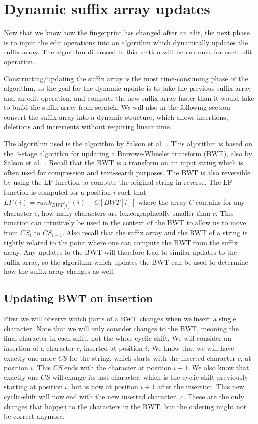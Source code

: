 \section{Dynamic suffix array updates}

Now that we know how the fingerprint has changed after an edit, the next phase is to input
the edit operations into an algorithm which dynamically updates the suffix array. The
algorithm discussed in this section will be run once for each edit operation.

Constructing/updating the suffix array is the most time-consuming phase of the algorithm,
so the goal for the dynamic update is to take the previous suffix array and an edit
operation, and compute the new suffix array faster than it would take to build the suffix
array from scratch. We will also in the following section convert the suffix array into a
dynamic structure, which allows insertions, deletions and increments without requiring
linear time.

The algorithm used is the algorithm by Salson et al.~\cite{DynamicExtendedSuffixArrays}.
This algorithm is based on the 4-stage algorithm for updating a Burrows-Wheeler transform
(BWT), also by Salson et al.~\cite{DynamicBWT}. Recall that the BWT is a transform on an
input string which is often used for compression and text-search purposes. The BWT is also
reversible by using the LF function to compute the original string in reverse. The
LF function is computed for a position $i$ such that $LF(i) = rank_{BWT[i]}(i) + C[BWT[i]]$
where the array $C$ contains for any character $c$, how many characters are
lexicographically smaller than $c$. This function can intuitively be used in the context
of the BWT to allow us to move from $CS_i$ to $CS_{i-1}$. Also recall that the suffix
array and the BWT of a string is tightly related to the point where one can compute the
BWT from the suffix array. Any updates to the BWT will therefore lead to similar updates
to the suffix array, so the algorithm which updates the BWT can be used to determine how
the suffix array changes as well.

\subsection*{Updating BWT on insertion}

First we will observe which parts of a BWT changes when we insert a single character. Note
that we will only consider changes to the BWT, meaning the final character in each shift,
not the whole cyclic-shift. We will consider an insertion of a character $c$, inserted at
position $i$. We know that we will have exactly one more $CS$ for the string, which starts
with the inserted character $c$, at position $i$. This $CS$ ends with the character at
position $i - 1$. We also know that exactly one $CS$ will change its last character, which
is the cyclic-shift previously starting at position $i$, but is now at position $i + 1$
after the insertion. This new cyclic-shift will now end with the new inserted character,
$c$. These are the only changes that happen to the characters in the BWT, but the ordering
might not be correct anymore.

